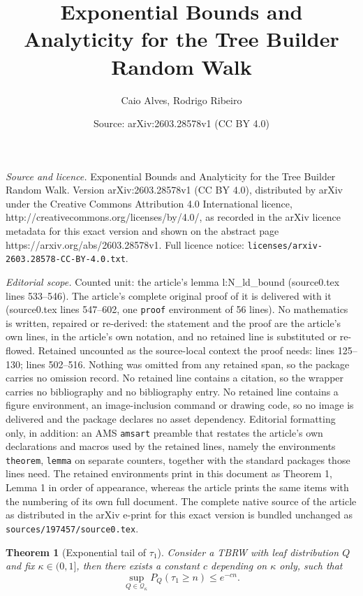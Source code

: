 \documentclass[10pt,a4paper]{amsart}
\title{Exponential Bounds and Analyticity for the Tree Builder Random Walk}
\author{Caio Alves, Rodrigo Ribeiro}
\date{Source: arXiv:2603.28578v1 (CC BY 4.0)}
\newtheorem{theorem}{Theorem}
\begin{document}
\maketitle

\noindent\emph{Source and licence.} Exponential Bounds and Analyticity for the Tree Builder Random Walk. Version arXiv:2603.28578v1 (CC BY 4.0), distributed by arXiv under the Creative Commons Attribution 4.0 International licence, http://creativecommons.org/licenses/by/4.0/, as recorded in the arXiv licence metadata for this exact version and shown on the abstract page https://arxiv.org/abs/2603.28578v1. Full licence notice: \texttt{licenses/arxiv-2603.28578-CC-BY-4.0.txt}.\par\smallskip

\noindent\textit{Editorial scope.} Counted unit: the article's lemma l:N\_ld\_bound (source0.tex lines 533--546). The article's complete original proof of it is delivered with it (source0.tex lines 547--602, one \texttt{proof} environment of 56 lines). No mathematics is written, repaired or re-derived: the statement and the proof are the article's own lines, in the article's own notation, and no retained line is substituted or re-flowed.  Retained uncounted as the source-local context the proof needs: lines 125--130; lines 502--516.  Nothing was omitted from any retained span, so the package carries no omission record.  No retained line contains a citation, so the wrapper carries no bibliography and no bibliography entry.  No retained line contains a figure environment, an image-inclusion command or drawing code, so no image is delivered and the package declares no asset dependency.  Editorial formatting only, in addition: an AMS \texttt{amsart} preamble that restates the article's own declarations and macros used by the retained lines, namely the environments \texttt{theorem}, \texttt{lemma} on separate counters, together with the standard packages those lines need.  The retained environments print in this document as Theorem 1, Lemma 1 in order of appearance, whereas the article prints the same items with the numbering of its own full document.  The complete native source of the article as distributed in the arXiv e-print for this exact version is bundled unchanged as \texttt{sources/197457/source0.tex}.
\begin{theorem}[Exponential tail of $\tau_1$]\label{t:tautail} Consider a TBRW with leaf distribution $Q$ and fix $\kappa\in (0,1]$, then there exists a constant $c$ depending on $\kappa$ only, such that
$$
\sup_{Q \in \mathcal{Q}_\kappa}P_Q(\tau_1 \ge n) \le e^{-cn}.
$$
    
\end{theorem}
\end{document}
